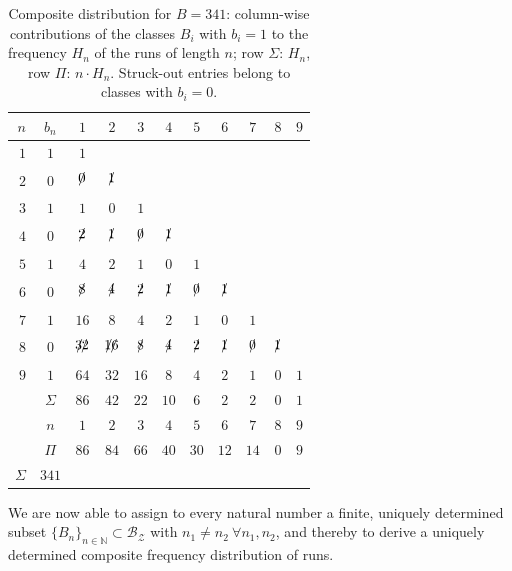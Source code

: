 \documentclass[11pt,a4paper]{scrartcl}
\theoremstyle{plain}
\theoremstyle{definition}
\theoremstyle{remark}
\begin{document}
\begin{table}[htbp]
\centering
\begin{tabular}{rcccccccccc}
\toprule
$n$&$b_n$&$1$&$2$&$3$&$4$&$5$&$6$&$7$&$8$&$9$\\\midrule
$1$&$1$&$ 1$&  &&  &&&& \\
$2$&$0$&$\xout    0$&$\xout  1$&   &&&&& \\
$3$&$1$&$  1$&$  0$&$  1$&&&&& \\
$4$&$0$&$\xout  2$&$\xout  1$&$\xout  0$&$\xout 1$&&&& \\
$5$&$1$&$  4$&$  2$&$  1$&$0$&$1$&&& \\
$6$&$0$&$\xout  8$&$\xout   4$&$\xout  2$&$\xout 1$&$\xout 0$&$\xout 1$&& \\
$7$&$1$&$16$&$  8$&$  4$&$2$&$1$&$0$&$1$& \\
$8$&$0$&$\xout {32}$&$\xout {16}$&$\xout   8$&$\xout 4$&$\xout 2$&$\xout 1$&$\xout 0$&$\xout 1$& \\
$9$&$1$&$64$&$32$&$16$&$8$&$4$&$2$&$1$&$0$&$1$\\\midrule
&$\Sigma$&$86$&$42$&$22$&$10$&$6$&$2$&$2$&$0$&$ 1$\\
&$n$&$1$&$2$&$3$&$4$&$5$&$6$&$7$&$8$&$9$\\
&$\Pi$&$86$&$84$&$66$&$40$&$30$&$12$&$14$&$0$&$9$\\
$\Sigma$&$341$&&&&&&&&&\\
\bottomrule
\end{tabular}
\caption{Composite distribution for $B=341$: column-wise
contributions of the classes $B_i$ with $b_i=1$ to the frequency
$H_n$ of the runs of length $n$; row $\Sigma$: $H_n$, row $\Pi$:
$n\cdot H_n$. Struck-out entries belong to classes with $b_i=0$.}
\label{tab:zusammengesetzt}
\end{table}

\noindent We are now able to assign to every natural number a
finite, uniquely determined subset
$\{B_n\}_{n\in\mathbb N} \subset \mathcal{B_Z}$ with $n_1\neq n_2\
\forall n_1,n_2$, and thereby to derive a uniquely determined
composite frequency distribution of runs.
\end{document}
